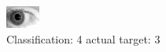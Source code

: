 \begin{figure}[h!]
\begin{center}
\includegraphics[width=0.60\columnwidth]{figures/ID291_class_4_target_3.png}
\end{center}
\caption{ Classification: 4 actual target: 3}
\label{fig:ID291_class_4_target_3}
\end{figure}

